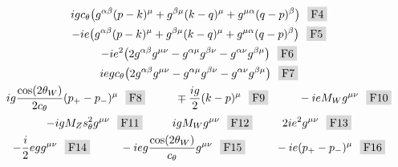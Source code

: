 \begin{gather*}
  ig\ct\big(g^{\alpha\beta}(p-k)^\mu+g^{\beta\mu}(k-q)^\mu
            +g^{\mu\alpha}(q-p)^\beta\big)~~\F4 \\
  -ie\big(g^{\alpha\beta}(p-k)^\mu+g^{\beta\mu}(k-q)^\mu
          +g^{\mu\alpha}(q-p)^\beta\big)~~\F5 \\
  -ie^2\big(2g^{\alpha\beta}g^{\mu\nu}-g^{\alpha\mu}g^{\beta\nu}
            -g^{\alpha\nu}g^{\beta\mu}\big)~~\F6 \\
  ieg\ct\big(2g^{\alpha\beta}g^{\mu\nu}-g^{\alpha\mu}g^{\beta\nu}
            -g^{\alpha\nu}g^{\beta\mu}\big)~~\F7 \\
  ig\frac{\cos(2\theta_W)}{2\ct}(p_+-p_-)^\mu~~\F8~~~~~~~~
  \mp\frac{ig}{2}(k-p)^\mu~~\F9~~~~~~~~
  -ieM_Wg^{\mu\nu}~~\F{10} \\
  -igM_Z \st^2 g^{\mu\nu}~~\F{11}~~~~~~~~
  igM_Wg^{\mu\nu}~~\F{12}~~~~~~~~
  2ie^2g^{\mu\nu}~~\F{13} \\
  -\frac{i}{2}egg^{\mu\nu}~~\F{14}~~~~~~~~
  -ieg\frac{\cos(2\theta_W)}{\ct}g^{\mu\nu}~~\F{15}~~~~~~~~
  -ie(p_+-p_-)^\mu~~\F{16}
\end{gather*}
